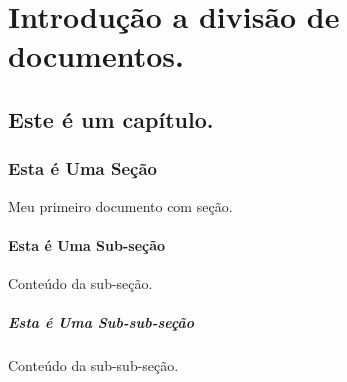 \documentclass{report}
\begin{document}
	\part{Introdução a divisão de documentos.}
	\chapter{Este é um capítulo.}
	\section{Esta é Uma Seção}
	Meu primeiro documento com seção.
	\subsection{Esta é Uma Sub-seção}
	Conteúdo da sub-seção.
	\subsubsection{Esta é Uma Sub-sub-seção}
	Conteúdo da sub-sub-seção.
\end{document}
